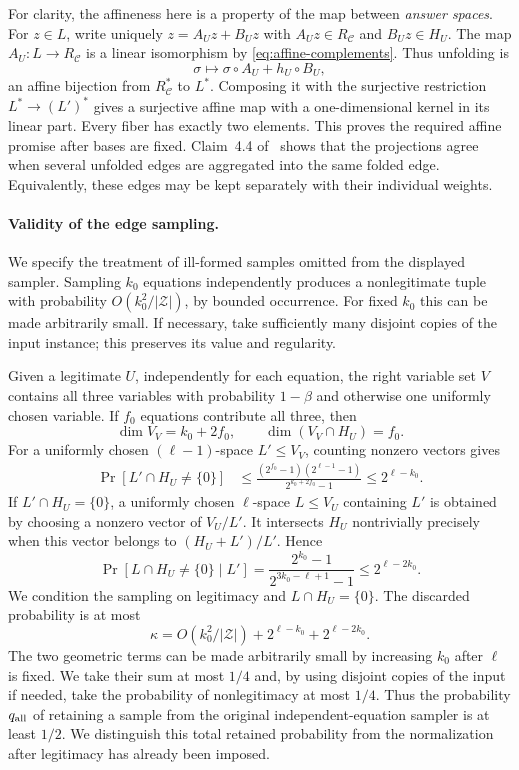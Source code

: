 For clarity, the affineness here is a property of the map between
\emph{answer spaces}.  For $z\in L$, write uniquely
$z=A_Uz+B_Uz$ with $A_Uz\in R_{\mathcal C}$ and $B_Uz\in H_U$.
The map $A_U:L\to R_{\mathcal C}$ is a linear isomorphism by
\eqref{eq:affine-complements}.  Thus unfolding is
\[
  \sigma\longmapsto\sigma\circ A_U+h_U\circ B_U,
\]
an affine bijection from $R_{\mathcal C}^*$ to $L^*$.
Composing it with the surjective restriction $L^*\to(L')^*$ gives a
surjective affine map with a one-dimensional kernel in its linear
part.  Every fiber has exactly two elements.  This proves the required
affine promise after bases are fixed.  Claim~4.4 of~\cite{DKKMS25}
shows that the projections agree when several unfolded edges are
aggregated into the same folded edge.  Equivalently, these edges may
be kept separately with their individual weights.

\paragraph{Validity of the edge sampling.}
We specify the treatment of ill-formed samples omitted from the displayed
sampler.  Sampling $k_0$ equations independently produces a
nonlegitimate tuple with probability
$O(k_0^2/|\mathcal Z|)$, by bounded occurrence.  For fixed $k_0$ this
can be made arbitrarily small.  If necessary, take sufficiently many
disjoint copies of the input instance; this preserves its value and
regularity.

Given a legitimate $U$, independently for each equation, the right
variable set $V$ contains all three variables with probability $1-\beta$
and otherwise one uniformly chosen variable.
If $f_0$ equations contribute all three, then
\[
  \dim V_V=k_0+2f_0,
  \qquad \dim(V_V\cap H_U)=f_0.
\]
For a uniformly chosen $(\ell-1)$-space $L'\leq V_V$, counting
nonzero vectors gives
\begin{align*}
  \Pr[L'\cap H_U\ne\{0\}]
  &\leq
  \frac{(2^{f_0}-1)(2^{\ell-1}-1)}{2^{k_0+2f_0}-1}
  \leq 2^{\ell-k_0}.
\end{align*}
If $L'\cap H_U=\{0\}$, a uniformly chosen $\ell$-space $L\leq V_U$
containing $L'$ is obtained by choosing a nonzero vector of $V_U/L'$.
It intersects $H_U$ nontrivially precisely when this vector belongs
to $(H_U+L')/L'$.  Hence
\[
  \Pr[L\cap H_U\ne\{0\}\mid L']
  =\frac{2^{k_0}-1}{2^{3k_0-\ell+1}-1}
  \leq 2^{\ell-2k_0}.
\]
We condition the sampling on legitimacy and $L\cap H_U=\{0\}$.
The discarded probability is at most
\begin{equation}
  \kappa=O(k_0^2/|\mathcal Z|)
          +2^{\ell-k_0}+2^{\ell-2k_0}.
  \label{eq:affine-invalid-probability}
\end{equation}
The two geometric terms can be made arbitrarily small by increasing
$k_0$ after $\ell$ is fixed.  We take their sum at most $1/4$ and,
by using disjoint copies of the input if needed, take the probability of
nonlegitimacy at most $1/4$.  Thus the probability $q_{\rm all}$ of
retaining a sample from the original independent-equation sampler is
at least $1/2$.  We distinguish this total retained probability from
the normalization after legitimacy has already been imposed.

